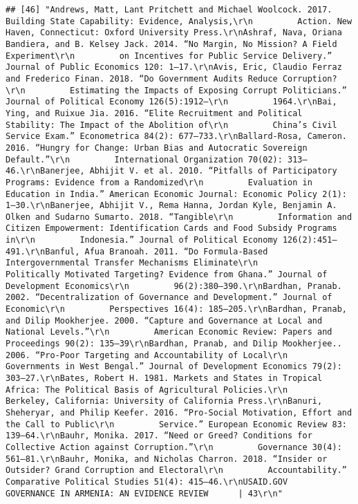 \documentclass[
]{article}
\begin{document}
\begin{verbatim}
## [46] "Andrews, Matt, Lant Pritchett and Michael Woolcock. 2017. Building State Capability: Evidence, Analysis,\r\n         Action. New Haven, Connecticut: Oxford University Press.\r\nAshraf, Nava, Oriana Bandiera, and B. Kelsey Jack. 2014. “No Margin, No Mission? A Field Experiment\r\n         on Incentives for Public Service Delivery.” Journal of Public Economics 120: 1–17.\r\nAvis, Eric, Claudio Ferraz and Frederico Finan. 2018. “Do Government Audits Reduce Corruption?\r\n         Estimating the Impacts of Exposing Corrupt Politicians.” Journal of Political Economy 126(5):1912–\r\n         1964.\r\nBai, Ying, and Ruixue Jia. 2016. “Elite Recruitment and Political Stability: The Impact of the Abolition of\r\n         China’s Civil Service Exam.” Econometrica 84(2): 677–733.\r\nBallard-Rosa, Cameron. 2016. “Hungry for Change: Urban Bias and Autocratic Sovereign Default.”\r\n         International Organization 70(02): 313–46.\r\nBanerjee, Abhijit V. et al. 2010. “Pitfalls of Participatory Programs: Evidence from a Randomized\r\n         Evaluation in Education in India.” American Economic Journal: Economic Policy 2(1): 1–30.\r\nBanerjee, Abhijit V., Rema Hanna, Jordan Kyle, Benjamin A. Olken and Sudarno Sumarto. 2018. “Tangible\r\n         Information and Citizen Empowerment: Identification Cards and Food Subsidy Programs in\r\n         Indonesia.” Journal of Political Economy 126(2):451–491.\r\nBanful, Afua Branoah. 2011. “Do Formula-Based Intergovernmental Transfer Mechanisms Eliminate\r\n         Politically Motivated Targeting? Evidence from Ghana.” Journal of Development Economics\r\n         96(2):380–390.\r\nBardhan, Pranab. 2002. “Decentralization of Governance and Development.” Journal of Economic\r\n         Perspectives 16(4): 185–205.\r\nBardhan, Pranab, and Dilip Mookherjee. 2000. “Capture and Governance at Local and National Levels.”\r\n         American Economic Review: Papers and Proceedings 90(2): 135–39\r\nBardhan, Pranab, and Dilip Mookherjee.. 2006. “Pro-Poor Targeting and Accountability of Local\r\n         Governments in West Bengal.” Journal of Development Economics 79(2): 303–27.\r\nBates, Robert H. 1981. Markets and States in Tropical Africa: The Political Basis of Agricultural Policies.\r\n         Berkeley, California: University of California Press.\r\nBanuri, Sheheryar, and Philip Keefer. 2016. “Pro-Social Motivation, Effort and the Call to Public\r\n         Service.” European Economic Review 83: 139–64.\r\nBauhr, Monika. 2017. “Need or Greed? Conditions for Collective Action against Corruption.”\r\n         Governance 30(4): 561–81.\r\nBauhr, Monika, and Nicholas Charron. 2018. “Insider or Outsider? Grand Corruption and Electoral\r\n         Accountability.” Comparative Political Studies 51(4): 415–46.\r\nUSAID.GOV                                                    GOVERNANCE IN ARMENIA: AN EVIDENCE REVIEW      | 43\r\n"                                                                                                                                                                                                                                                                                                                                                                                                                              
\end{verbatim}
\end{document}
